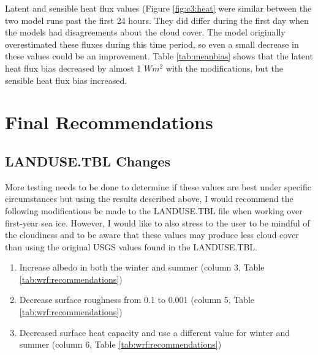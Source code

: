 Latent and sensible heat flux values (Figure \ref{fig:c3:heat} were similar between the two model runs past the first 24 hours. They did differ during the first day when the models had disagreements about the cloud cover. The model originally overestimated these fluxes during this time period, so even a small decrease in these values could be an improvement. Table \ref{tab:meanbias} shows that the latent heat flux bias decreased by almost 1 $Wm^{2}$ with the modifications, but the sensible heat flux bias increased. 

\section{Final Recommendations}


\subsection{LANDUSE.TBL Changes}

More testing needs to be done to determine if these values are best under specific circumstances but using the results described above, I would recommend the following modifications be made to the LANDUSE.TBL file when working over first-year sea ice. However, I would like to also stress to the user to be mindful of the cloudiness and to be aware that these values may produce less cloud cover than using the original USGS values found in the LANDUSE.TBL.

\begin{enumerate}
  \item Increase albedo in both the winter and summer (column 3, Table \ref{tab:wrf:recommendations})
   \item Decrease surface roughness from 0.1 to 0.001 (column 5, Table \ref{tab:wrf:recommendations})
  \item Decreased surface heat capacity and use a different value for winter and summer (column 6, Table \ref{tab:wrf:recommendations})
\end{enumerate}


